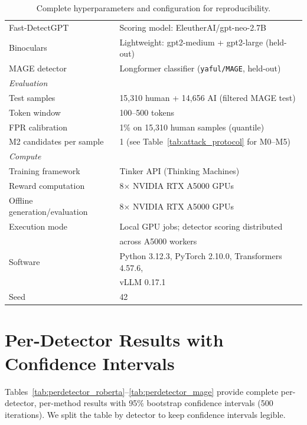 \documentclass[11pt]{article}
\begin{document}
\begin{table}[H]
\begin{tabular}{ll}
Fast-DetectGPT & Scoring model: EleutherAI/gpt-neo-2.7B \\
Binoculars & Lightweight: gpt2-medium + gpt2-large (held-out) \\
MAGE detector & Longformer classifier (\texttt{yaful/MAGE}, held-out) \\
\midrule
\multicolumn{2}{l}{\textit{Evaluation}} \\
Test samples & 15,310 human + 14,656 AI (filtered MAGE test) \\
Token window & 100--500 tokens \\
FPR calibration & 1\% on 15,310 human samples (quantile) \\
M2 candidates per sample & 1 (see Table~\ref{tab:attack_protocol} for M0--M5) \\
\midrule
\multicolumn{2}{l}{\textit{Compute}} \\
Training framework & Tinker API (Thinking Machines) \\
Reward computation & 8$\times$ NVIDIA RTX A5000 GPUs \\
Offline generation/evaluation & 8$\times$ NVIDIA RTX A5000 GPUs \\
Execution mode & Local GPU jobs; detector scoring distributed \\
& across A5000 workers \\
Software & Python 3.12.3, PyTorch 2.10.0, Transformers 4.57.6, \\
& vLLM 0.17.1 \\
Seed & 42 \\
\bottomrule
\end{tabular}
\caption{Complete hyperparameters and configuration for reproducibility.}
\label{tab:hyperparams}
\end{table}

\FloatBarrier
\section{Per-Detector Results with Confidence Intervals}
\label{app:perdetector}

Tables~\ref{tab:perdetector_roberta}--\ref{tab:perdetector_mage} provide complete per-detector, per-method results with 95\% bootstrap confidence intervals (500 iterations). We split the table by detector to keep confidence intervals legible.

\begin{table}[H]
\centering
\small
\setlength{\tabcolsep}{4pt}

\caption{RoBERTa results with 95\% bootstrap confidence intervals. Bold indicates the best attacker value per metric.}
\label{tab:perdetector_roberta}
\end{table}
\end{document}
